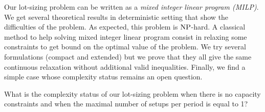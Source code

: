 Our lot-sizing problem can be written as a \emph{mixed integer linear program (MILP)}.
We get several theoretical results in deterministic setting that show the difficulties of the problem.
As expected, this problem is $\operatorname{NP}$-hard.
A classical method to help solving mixed integer linear program consist in relaxing some constraints to get bound on the optimal value of the problem.
We try several formulations (compact and extended) but we prove that they all give the same continuous relaxation without additional valid inequalities.
Finally, we find a simple case whose complexity status remains an open question.
\begin{question}
What is the complexity status of our lot-sizing problem when there is no capacity constraints and when the maximal number of setups per period is equal to 1?
\end{question}


\medskip


